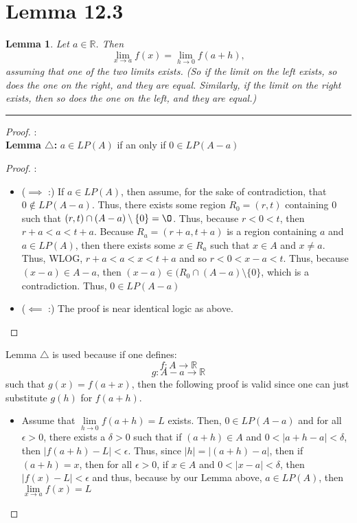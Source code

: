 \documentclass[openany, amssymb, psamsfonts]{amsart}
\newcommand{\bbR}{\mathbb{R}}
\renewcommand{\emptyset}{\O}
\newcommand{\sm}{\setminus}
\newtheorem{lem}{Lemma}[section]
\theoremstyle{definition}
\numberwithin{equation}{section}
\begin{document}
\section*{Lemma 12.3}
\begin{lem} \label{12.3}
	Let $a \in \bbR$. Then 
	\[
		\lim\limits_{x \to a}f(x) = \lim\limits_{h \to 0}f(a + h),
	\]
	assuming that one of the two limits exists. (So if the limit on the left exists, so does the one on the right, and they are equal. Similarly, if the limit on the right exists, then so does the one on the left, and they are equal.)
\end{lem} 

 \vspace{4pt}     \hrule   \vspace{4pt} \begin{proof}:\\
\textbf{Lemma $\triangle$:} $a\in LP(A)$ if an only if $0\in LP(A - a)$
\begin{proof}:\\
    \begin{itemize}
        \item ($\implies$ :) If $a\in LP(A)$, then assume, for the sake of contradiction, that $0\notin LP(A-a)$. Thus, there exists some region $R_0 = (r,t)$ containing $0$ such that $(r,t) \cap (A-a)\setminus\{0\} = \emptyset$. Thus, because $r<0<t$, then $r+a<a<t+a$. Because $R_a = (r+a, t+a)$ is a region containing $a$ and $a\in LP(A)$, then there exists some $x\in R_a$ such that $x\in A$ and $x\neq a$. Thus, WLOG, $r+a<a<x<t+a$ and so $r<0<x-a<t$. Thus, because $(x-a)\in A-a$, then $(x-a)\in (R_0 \cap (A-a)\sm\{0\}$, which is a contradiction. Thus, $0\in LP(A-a)$
        \item ($\impliedby$ :) The proof is near identical logic as above.
    \end{itemize}
\end{proof}
Lemma $\triangle$ is used because if one defines:
\[f: A \to \bbR\]
\[g: A-a \to \bbR\]
such that $g(x) = f(a+x)$, then the following proof is valid since one can just substitute $g(h)$ for $f(a+h)$. 
 \begin{itemize}
     \item Assume that $\lim\limits_{h\to 0}f(a+h) = L$ exists. Then, $0\in LP(A-a)$ and for all $\epsilon>0$, there exists a $\delta >0$ such that if $(a+h) \in A$ and $0<|a+h - a|<\delta$, then $|f(a+h)-L|<\epsilon$. Thus, since $|h| = |(a+h) - a|$, then if $(a+h) = x$, then for all $\epsilon >0$, if $x\in A$ and $0<|x-a|<\delta$, then $|f(x) - L|<\epsilon$ and thus, because by our Lemma above, $a\in LP(A)$, then $\lim\limits_{x\to a}f(x) = L$

\end{itemize}
\end{proof}
\end{document}
